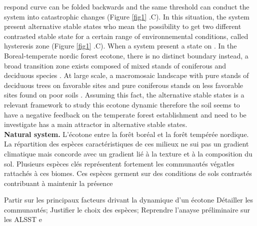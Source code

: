 respond curve can be folded backwards and the same threshold can conduct the
system into catastrophic changes (Figure \ref{fig1} .C). In this situation, the
system present alternative stable states who mean the possibility to get two
different contrasted stable state for a certain range of environnemental
conditions, called hysteresis zone (Figure \ref{fig1} .C).  When a system
present a state on    . In the Boreal-temperate nordic forest ecotone, there is
no distinct boundary instead, a broad transition zone exists composed of mixed
stands of coniferous and deciduous species \cite{Goldblum2010}. At large scale,
a macromosaic landscape with pure stands of deciduous trees on favorable sites
and pure coniferous stands on less favorable sites found on poor soils
\cite{Goldblum2010}. Assuming this fact, the alternative stable states is a
relevant framework to study this ecotone dynamic therefore the soil seems to
have a negative feedback on the temperate forest establishment and need to be
investigate has a main attractor in alternative stable states. \\


\textbf{Natural system.} L'écotone entre la forêt boréal et la forêt tempérée
nordique. La répartition des espèces caractéristiques de ces milieux ne sui
pas un gradient climatique mais concorde avec un gradient lié à la texture et
à la composition du sol. Plusieurs espèces clés représentent fortement les
communautés végatles rattachés à ces biomes. Ces espèces germent sur des
conditions de sols contrastés contribuant à maintenir la présence


Partir sur les principaux facteurs drivant la dynamique d'un écotone
Détailler les communautés;
Justifier le choix des espèces; 
Reprendre l'anayse préliminaire sur les ALSST e




